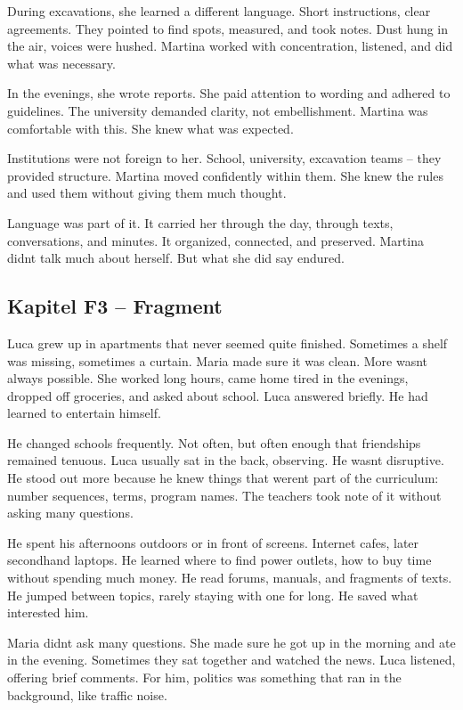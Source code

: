 \documentclass[
]{article}
\begin{document}
During excavations, she learned a different language. Short instructions, clear agreements. They pointed to find spots, measured, and took notes. Dust hung in the air, voices were hushed. Martina worked with concentration, listened, and did what was necessary.

In the evenings, she wrote reports. She paid attention to wording and adhered to guidelines. The university demanded clarity, not embellishment. Martina was comfortable with this. She knew what was expected.

Institutions were not foreign to her. School, university, excavation teams -- they provided structure. Martina moved confidently within them. She knew the rules and used them without giving them much thought.

Language was part of it. It carried her through the day, through texts, conversations, and minutes. It organized, connected, and preserved. Martina didn\textquotesingle t talk much about herself. But what she did say endured.

\subsection{Kapitel F3 -- Fragment}\label{kapitel-f3-fragment}

Luca grew up in apartments that never seemed quite finished. Sometimes a shelf was missing, sometimes a curtain. Maria made sure it was clean. More wasn\textquotesingle t always possible. She worked long hours, came home tired in the evenings, dropped off groceries, and asked about school. Luca answered briefly. He had learned to entertain himself.

He changed schools frequently. Not often, but often enough that friendships remained tenuous. Luca usually sat in the back, observing. He wasn\textquotesingle t disruptive. He stood out more because he knew things that weren\textquotesingle t part of the curriculum: number sequences, terms, program names. The teachers took note of it without asking many questions.

He spent his afternoons outdoors or in front of screens. Internet cafes, later secondhand laptops. He learned where to find power outlets, how to buy time without spending much money. He read forums, manuals, and fragments of texts. He jumped between topics, rarely staying with one for long. He saved what interested him.

Maria didn\textquotesingle t ask many questions. She made sure he got up in the morning and ate in the evening. Sometimes they sat together and watched the news. Luca listened, offering brief comments. For him, politics was something that ran in the background, like traffic noise.
\end{document}
